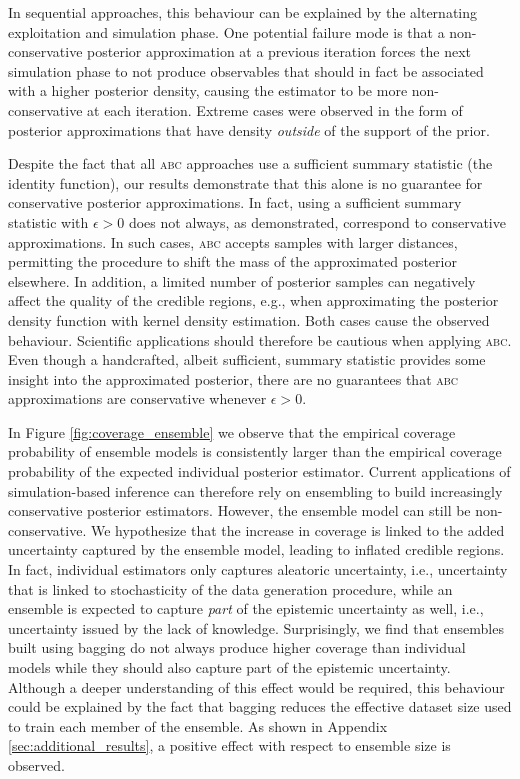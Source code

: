 \documentclass[twoside]{article}
\begin{document}
In sequential approaches, this behaviour can be explained by the alternating exploitation and simulation phase. One potential failure mode
is that a non-conservative posterior approximation at a previous iteration forces the next simulation phase to not produce observables
that should in fact be associated with a higher posterior density, causing the estimator to be more non-conservative at each iteration.
Extreme cases were observed in the form of posterior approximations that have density \emph{outside} of the support of the prior.

Despite the fact that all \textsc{abc} approaches use a sufficient summary statistic (the identity function), our results demonstrate that this alone is no guarantee for conservative posterior approximations. In fact,
using a sufficient summary statistic with $\epsilon > 0$ does not always, as demonstrated, correspond to conservative approximations.
In such cases, \textsc{abc} accepts
samples with larger distances, permitting the procedure to shift the mass of the approximated posterior elsewhere. In addition, a limited number of posterior samples can negatively affect the quality of the credible regions, e.g., when approximating the posterior density function with kernel density estimation.
Both cases cause the observed behaviour. Scientific applications should therefore be cautious when applying \textsc{abc}. Even though a handcrafted, albeit sufficient, summary statistic provides some insight into the approximated posterior, there are no guarantees that \textsc{abc} approximations are conservative whenever $\epsilon > 0$.

In Figure \ref{fig:coverage_ensemble} we observe that the empirical coverage probability of ensemble models is consistently larger than the empirical coverage probability of the expected individual posterior estimator. Current applications of simulation-based inference can therefore rely on ensembling to build increasingly conservative posterior estimators. However, the ensemble model can still be non-conservative. We hypothesize that the increase in coverage is linked to the added uncertainty captured by the ensemble model, leading to inflated credible regions. In fact, individual estimators only captures aleatoric uncertainty, i.e., uncertainty that is linked to stochasticity of the data generation procedure, while an ensemble is expected to capture \emph{part} of the epistemic uncertainty as well, i.e., uncertainty issued by the lack of knowledge. Surprisingly, we find that ensembles built using bagging do not always produce higher coverage than individual models while they should also capture part of the epistemic uncertainty. Although a deeper understanding of this effect would be required, this behaviour could be explained by the fact that bagging reduces the effective dataset size used to train each member of the ensemble. As shown in Appendix \ref{sec:additional_results}, a positive effect with respect to ensemble size is observed.
\end{document}
